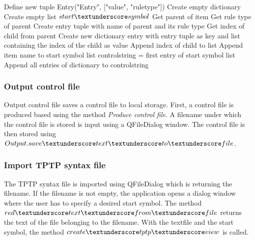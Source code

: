 \begin{algorithm}[H]
\caption{GUI Algorithm: produce\textunderscore controlfile}
\label{alg:produceControlfile}
\begin{algorithmic}[1] 
\State Define new tuple Entry("Entry", ["value", "rule\textunderscore type"])
\State Create empty dictionary
\State Create empty list $start\textunderscore symbol$
	\State Get parent of item
		\State Get rule type of parent
		\State Create entry tuple with name of parent and its rule type
		\State Get index of child from parent
			\State Create new dictionary entry with entry tuple as key and list containing the index of the child as value
		\Else
			\State Append index of child to list
		\EndIf
		\State Append item name to start symbol list
	\EndIf
\EndFor
\State control\textunderscore string = first entry of start symbol list
\State Append all entries of dictionary to control\textunderscore string
\end{algorithmic}
\end{algorithm} 

\subsubsection{Output control file}\label{sec:ImplementationGUIOutput control file}

Output control file saves a control file to local storage. 
First, a control file is produced based using the method \textit{Produce control file}. A filename under which the control file is stored is input using a QFileDialog window. The control file is then stored using $Output.save\textunderscore text\textunderscore to\textunderscore file$.

\subsubsection{Import \ac{TPTP} syntax file}\label{sec:ImplementationGUIImportFile}

The \ac{TPTP} syntax file is imported using QFileDialog which is returning the filename. If the filename is not empty, the application opens a dialog window where the user has to specify a desired start symbol. The method $red\textunderscore text\textunderscore from\textunderscore file$ returns the text of the file belonging to the filename. With the textfile and the start symbol, the method $create\textunderscore tptp\textunderscore view$ is called.


